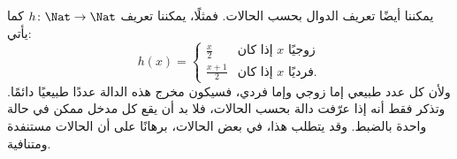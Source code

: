 \documentclass[../../../include/open-logic-section]{subfiles}
\begin{document}
\begin{ex}
يمكننا أيضًا تعريف الدوال بحسب الحالات. فمثلًا، يمكننا تعريف
$h \colon \Nat \to \Nat$  كما يأتي:
\[
h(x) =
\begin{cases}
  \frac{x}{2} & \text{إذا كان $x$ زوجيًا} \\
  \frac{x+1}{2} & \text{إذا كان $x$ فرديًا.}
\end{cases}
\]
ولأن كل عدد طبيعي إما زوجي وإما فردي، فسيكون مخرج هذه
الدالة عددًا طبيعيًا دائمًا. وتذكر فقط أنه إذا
عرّفت دالة بحسب الحالات، فلا بد أن يقع كل مدخل ممكن في
حالة واحدة بالضبط. وقد يتطلب هذا، في بعض الحالات، برهانًا على أن
الحالات مستنفدة ومتنافية.
\end{ex}
\end{document}
